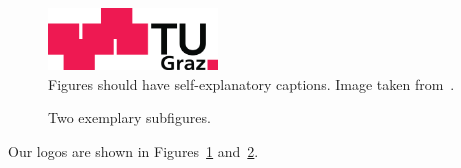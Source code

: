 \begin{figure}
    \centering
    \includegraphics[width=0.4\textwidth]{tug_logo}
    \caption{Figures should have self-explanatory captions.
        Image taken from~\cite{tug-website}.}
    \label{fig:example1}
\end{figure}

\begin{figure}
    \centering
    \hspace{1cm}
    \caption{Two exemplary subfigures.}
    \label{fig:example2}
\end{figure}

Our logos are shown in Figures~\ref{fig:example1}
and~\ref{fig:example2}.
